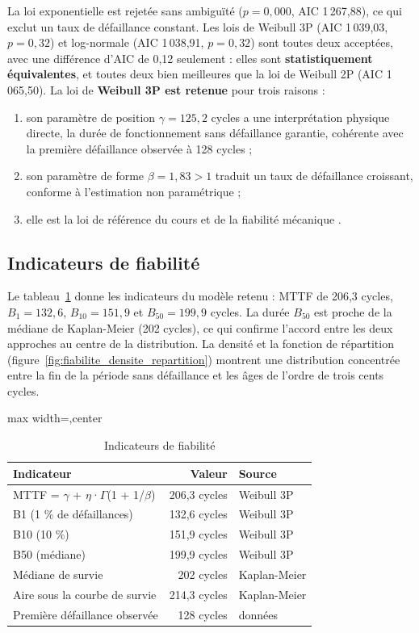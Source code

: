 La loi exponentielle est rejetée sans ambiguïté ($p = 0{,}000$, AIC 1\,267,88), ce qui exclut un taux de défaillance constant. Les lois de Weibull 3P (AIC 1\,039,03, $p = 0{,}32$) et log-normale (AIC 1\,038,91, $p = 0{,}32$) sont toutes deux acceptées, avec une différence d'AIC de 0,12 seulement : elles sont \textbf{statistiquement équivalentes}, et toutes deux bien meilleures que la loi de Weibull 2P (AIC 1\,065,50). La loi de \textbf{Weibull 3P est retenue} pour trois raisons :

\begin{enumerate}
\item son paramètre de position $\gamma = 125{,}2$ cycles a une interprétation physique directe, la durée de fonctionnement sans défaillance garantie, cohérente avec la première défaillance observée à 128 cycles ;
\item son paramètre de forme $\beta = 1{,}83 > 1$ traduit un taux de défaillance croissant, conforme à l'estimation non paramétrique ;
\item elle est la loi de référence du cours et de la fiabilité mécanique \cite{benhmida,weibull1951}.
\end{enumerate}

\subsection{Indicateurs de fiabilité}

Le tableau~\ref{tab:fiabilite_indicateurs} donne les indicateurs du modèle retenu : MTTF de 206,3 cycles, $B_1 = 132{,}6$, $B_{10} = 151{,}9$ et $B_{50} = 199{,}9$ cycles. La durée $B_{50}$ est proche de la médiane de Kaplan-Meier (202 cycles), ce qui confirme l'accord entre les deux approches au centre de la distribution. La densité et la fonction de répartition (figure~\ref{fig:fiabilite_densite_repartition}) montrent une distribution concentrée entre la fin de la période sans défaillance et les âges de l'ordre de trois cents cycles.

\begin{table}[htbp]
\centering\small
\begin{adjustbox}{max width=\linewidth,center}
\begin{tabular}{lrl}
\toprule
Indicateur & Valeur & Source \\
\midrule
MTTF = \ensuremath{\gamma} + \ensuremath{\eta}·\ensuremath{\Gamma}(1 + 1/\ensuremath{\beta}) & 206,3 cycles & Weibull 3P \\
B1 (1 \% de défaillances) & 132,6 cycles & Weibull 3P \\
B10 (10 \%) & 151,9 cycles & Weibull 3P \\
B50 (médiane) & 199,9 cycles & Weibull 3P \\
Médiane de survie & 202 cycles & Kaplan-Meier \\
Aire sous la courbe de survie & 214,3 cycles & Kaplan-Meier \\
Première défaillance observée & 128 cycles & données \\
\bottomrule
\end{tabular}
\end{adjustbox}
\caption{Indicateurs de fiabilité}\label{tab:fiabilite_indicateurs}
\end{table}


